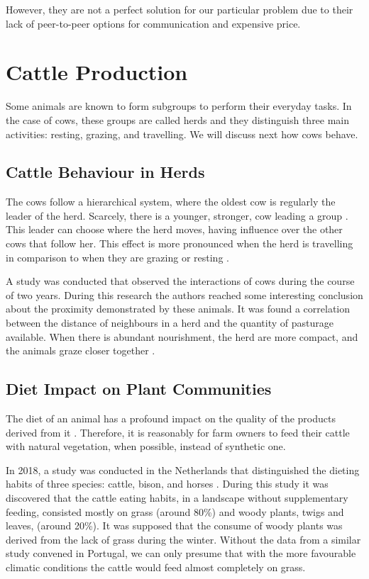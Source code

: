 However, they are not a perfect solution for our particular
problem due to their lack of peer-to-peer options for communication and expensive price.


\section{Cattle Production}
\label{sec:cows}
Some animals are known to form subgroups to perform their everyday tasks. In the case of
cows, these groups are called herds and they distinguish three main activities: resting,
grazing, and travelling. We will discuss next how cows behave.

\subsection{Cattle Behaviour in Herds}
\label{subsec:behaviour_herds}
The cows follow a hierarchical system, where the oldest cow is regularly the leader of the
herd. Scarcely, there is a younger, stronger, cow leading a group \cite{Harris2007}. This
leader can choose where the herd moves, having influence over the other cows that follow her.
This effect is more pronounced when the herd is travelling in comparison to when they are
grazing or resting \cite{Vsarova2010}.

A study was conducted that observed the interactions of cows during the course of two
years. During this research the authors reached some interesting conclusion about the proximity
demonstrated by these animals. It was found a correlation between the distance of neighbours
in a herd and the quantity of pasturage available. When there is abundant nourishment, the
herd are more compact, and the animals graze closer together \cite{Harris2007}.

\subsection{Diet Impact on Plant Communities}
\label{subsec:diet}
The diet of an animal has a profound impact on the quality of the products derived from it \cite{Araujo2014}.
Therefore, it is reasonably for farm owners to feed their cattle with natural vegetation, when
possible, instead of synthetic one.

In 2018, a study was conducted in the Netherlands that distinguished the dieting habits of
three species: cattle, bison, and horses \cite{Cromsigt2018}. During this study it was
discovered that the cattle eating habits, in a landscape without supplementary feeding,
consisted mostly on grass (around 80\%) and woody plants, twigs and leaves, (around 20\%). It
was supposed that the consume of woody plants was derived from the lack of grass during the
winter. Without the data from a similar study convened in Portugal, we can only presume that
with the more favourable climatic conditions the cattle would feed almost completely on grass.

